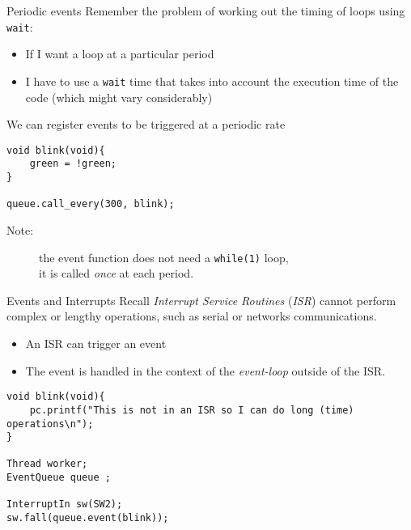 \documentclass[xcolor=svgnames]{beamer}
\begin{document}
\begin{frame}[fragile]{Periodic events}
Remember the problem of working out the timing of loops using \texttt{wait}:
\begin{itemize}
    \item If I want a loop at a particular period
    \item I have to use a \texttt{wait} time that takes into account the execution time of the code (which might vary considerably)
\end{itemize}

We can register events to be triggered at a periodic rate
\begin{tcolorbox}
\begin{verbatim}
void blink(void){
    green = !green;
}

queue.call_every(300, blink);
\end{verbatim}
\end{tcolorbox}
\begin{description}
    \item[Note:] the event function does not need a \texttt{while(1)} loop,\\
    it is called \emph{once} at each period.
\end{description}
\end{frame}

\begin{frame}[fragile]{Events and Interrupts}
Recall \emph{Interrupt Service Routines} (\emph{ISR}) cannot perform complex or lengthy operations, such as serial or networks communications.

\begin{itemize}
    \item An ISR can trigger an event
    \item The event is handled in the context of the \emph{event-loop} outside of the ISR.
\end{itemize}
\begin{tcolorbox}
\begin{verbatim}
void blink(void){
    pc.printf("This is not in an ISR so I can do long (time) operations\n");
}

Thread worker;
EventQueue queue ;

InterruptIn sw(SW2);
sw.fall(queue.event(blink));
\end{verbatim}
\end{tcolorbox}
\end{frame}
\end{document}
